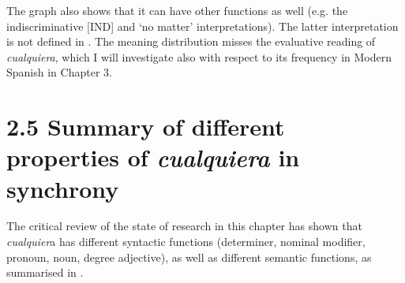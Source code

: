 The graph also shows that it can have other functions as well (e.g. the indiscriminative [IND] and ‘no matter’ interpretations). The latter interpretation is not defined in . The meaning distribution misses the evaluative reading of \textit{cualquiera}, which I will investigate also with respect to its frequency in Modern Spanish in Chapter 3.

\section{\textbf{2.5} \textbf{Summary} \textbf{of} \textbf{different} \textbf{properties} \textbf{of} \textbf{\textit{cualquiera}} \textbf{in} \textbf{synchrony}}

The critical review of the state of research in this chapter has shown that \textit{cualquier}a has different syntactic functions (determiner, nominal modifier, pronoun, noun, degree adjective), as well as different semantic functions, as summarised in .


